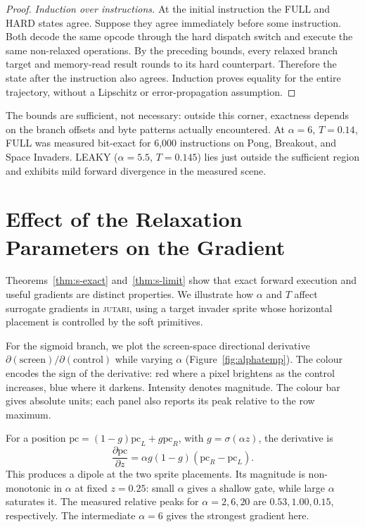 \documentclass[letterpaper]{article} %
\begin{document}
\begin{proof}
\textit{Induction over instructions.}
At the initial instruction the FULL and HARD
states agree. Suppose they agree immediately
before some instruction. Both decode the same
opcode through the hard dispatch switch and
execute the same non-relaxed operations.
By the preceding bounds, every relaxed branch
target and memory-read result rounds to its
hard counterpart. Therefore the state after
the instruction also agrees. Induction proves
equality for the entire trajectory, without
a Lipschitz or error-propagation assumption.
\end{proof}

The bounds are sufficient, not necessary:
outside this corner, exactness depends on the
branch offsets and byte patterns actually
encountered. At $\alpha=6$, $T=0.14$, FULL
was measured bit-exact for 6,000 instructions
on Pong, Breakout, and Space Invaders.
LEAKY ($\alpha=5.5$, $T=0.145$) lies just
outside the sufficient region and exhibits
mild forward divergence in the measured scene.

\section{Effect of the Relaxation Parameters on the Gradient}

Theorems~\ref{thm:s-exact} and~\ref{thm:s-limit} show
that exact forward execution and useful gradients
are distinct properties. We illustrate how $\alpha$
and $T$ affect surrogate gradients in \textsc{jutari},
using a target invader sprite whose horizontal placement
is controlled by the soft primitives.

For the sigmoid branch, we plot the screen-space
directional derivative
$\partial(\text{screen})/\partial(\text{control})$
while varying $\alpha$ (Figure~\ref{fig:alphatemp}).
The colour encodes the sign of the derivative:
red where a pixel brightens as the control increases,
blue where it darkens. Intensity denotes magnitude.
The colour bar gives absolute units; each panel
also reports its peak relative to the row maximum.

For a position
$\mathrm{pc}=(1-g)\mathrm{pc}_L+g\mathrm{pc}_R$,
with $g=\sigma(\alpha z)$, the derivative is
\begin{equation}
\frac{\partial\mathrm{pc}}{\partial z}
=\alpha g(1-g)(\mathrm{pc}_R-\mathrm{pc}_L).
\end{equation}
This produces a dipole at the two sprite placements.
Its magnitude is non-monotonic in $\alpha$ at fixed
$z=0.25$: small $\alpha$ gives a shallow gate,
while large $\alpha$ saturates it. The measured
relative peaks for $\alpha=2,6,20$ are
$0.53,1.00,0.15$, respectively. The intermediate
$\alpha=6$ gives the strongest gradient here.
\end{document}
